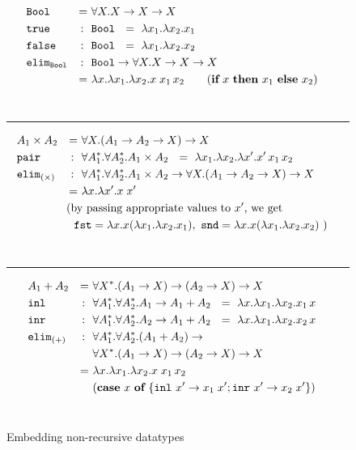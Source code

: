 \begin{figure}
\begin{singlespace}
\begin{align*}
&\!\!\!\!\!\!\mathtt{Bool} &=~& \forall X.X -> X -> X \\
&\!\!\!\!\!\!\mathtt{true}  &\!\!\!:~~& \texttt{Bool} ~~=~ \l x_1.\l x_2. x_1 \\
&\!\!\!\!\!\!\mathtt{false} &\!\!\!:~~& \texttt{Bool} ~~=~ \l x_1.\l x_2. x_2 \\
&\!\!\!\!\!\!\mathtt{elim_{Bool}} &\!\!\!:~~& \texttt{Bool} -> \forall X.X -> X -> X \\
&	&=~& \l x.\l x_1. \l x_2. x\;x_1\,x_2 \qquad
(\textbf{if}~x~\textbf{then}~x_1~\textbf{else}~x_2)
\end{align*}\vspace*{-19pt} \\ \vspace*{-4pt}
\rule{\linewidth}{.4pt}
\begin{align*}
&\!\!\!\!\!\!A_1\times A_2 &=~& \forall X. (A_1 -> A_2 -> X) -> X \\
&\!\!\!\!\!\!\mathtt{pair} &\!\!\!:~~&
	\forall A_1^{*}.\forall A_2^{*}.A_1\times A_2
	~~=~ \l x_1.\l x_2.\l x'.x'\,x_1\,x_2 \\
&\!\!\!\!\!\!\mathtt{elim_{(\times)}} &\!\!\!:~~&
	\forall A_1^{*}.\forall A_2^{*}.A_1\times A_2 ->
	\forall X. (A_1 -> A_2 -> X) -> X \\
	& &=~& \l x.\l x'.x\;x' \\
 &&&\!\!\!\!\!\!\!\!\text{(by passing appropriate values to $x'$, we get}\\
 &&&\!\!\!\!\texttt{fst} = \l x.x(\l x_1.\l x_2.x_1),~
            \texttt{snd} = \l x.x(\l x_1.\l x_2.x_2) ~)
\end{align*} \vspace*{-19pt} \\ \vspace*{-4pt}
\rule{\linewidth}{.4pt}
\begin{align*}
&\!\!\!\!\!\!A_1+A_2 &=~&\forall X^{*}. (A_1 -> X) -> (A_2 -> X) -> X \\
&\!\!\!\!\!\!\mathtt{inl} &\!\!\!:~~& \forall A_1^{*}.\forall A_2^{*}.A_1-> A_1+A_2
	~~=~ \l x. \l x_1. \l x_2 . x_1\,x \\
&\!\!\!\!\!\!\mathtt{inr} &\!\!\!:~~& \forall A_1^{*}.\forall A_2^{*}.A_2-> A_1+A_2
	~~=~ \l x. \l x_1. \l x_2 . x_2\,x \\
&\!\!\!\!\!\!\mathtt{elim_{(+)}} &\!\!\!:~~&
	\forall A_1^{*}.\forall A_2^{*}.(A_1+A_2) -> \\
	&&& \forall X^{*}. (A_1 -> X) -> (A_2 -> X) -> X \\
	& &=~& \l x.\l x_1. \l x_2. x\;x_1\,x_2 \\
	&&&			(\textbf{case}~x~\textbf{of}~
				\{\mathtt{inl}~x' -> x_1\;x';
				  \mathtt{inr}~x' -> x_2\;x'\})
\end{align*}~\vspace*{-10pt}
\end{singlespace}
\caption{Embedding non-recursive datatypes}
\label{fig:churchnonrec}
\end{figure}
